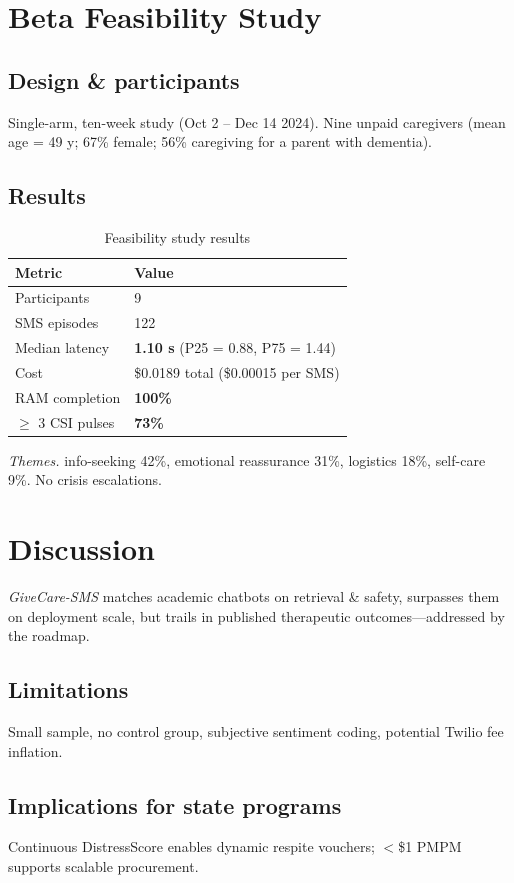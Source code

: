\documentclass[12pt]{article}
\begin{document}
\section{Beta Feasibility Study}

\subsection{Design \& participants}
Single-arm, ten-week study (Oct 2 -- Dec 14 2024). Nine unpaid caregivers (mean age = 49 y; 67\% female; 56\% caregiving for a parent with dementia).

\subsection{Results}
\begin{table}[htbp]
\centering
\begin{tabular}{ll}
\toprule
Metric & Value \\
\midrule
Participants & 9 \\
SMS episodes & 122 \\
Median latency & \textbf{1.10 s} (P25 = 0.88, P75 = 1.44) \\
Cost & \$0.0189 total (\$0.00015 per SMS) \\
RAM completion & \textbf{100\%} \\
$\geq$ 3 CSI pulses & \textbf{73\%} \\
\bottomrule
\end{tabular}
\caption{Feasibility study results}
\end{table}

\emph{Themes.} info-seeking 42\%, emotional reassurance 31\%, logistics 18\%, self-care 9\%. No crisis escalations.

\section{Discussion}

\emph{GiveCare-SMS} matches academic chatbots on retrieval \& safety, surpasses them on deployment scale, but trails in published therapeutic outcomes---addressed by the roadmap.

\subsection{Limitations}
Small sample, no control group, subjective sentiment coding, potential Twilio fee inflation.

\subsection{Implications for state programs}
Continuous DistressScore enables dynamic respite vouchers; $<$\$1 PMPM supports scalable procurement.
\end{document}
